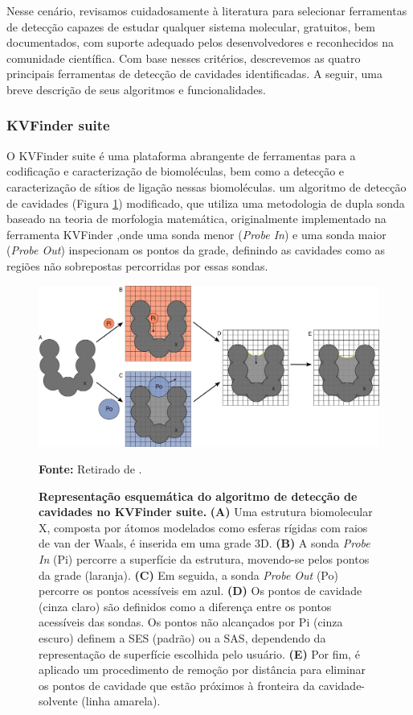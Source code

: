 \documentclass[Portugues]{phdquali}
\begin{document}
Nesse cenário, revisamos cuidadosamente à literatura para selecionar ferramentas de detecção capazes de estudar qualquer sistema molecular, gratuitos, bem documentados, com suporte adequado pelos desenvolvedores e reconhecidos na comunidade científica. Com base nesses critérios, descrevemos as quatro principais ferramentas de detecção de cavidades identificadas. A seguir, uma breve descrição de seus algoritmos e funcionalidades.

\subsubsection{KVFinder suite}

O KVFinder suite é uma plataforma abrangente de ferramentas para a codificação e caracterização de biomoléculas, bem como a detecção e caracterização de sítios de ligação nessas biomoléculas.  um algoritmo de detecção de cavidades (Figura \ref{fig:kvfinder-suite-schema}) modificado, que  utiliza uma metodologia de dupla sonda baseado na teoria de morfologia matemática, originalmente implementado na ferramenta KVFinder \cite{oliveira2014},onde uma sonda menor (\textit{Probe In}) e uma sonda maior (\textit{Probe Out}) inspecionam os pontos da grade, definindo as cavidades como as regiões não sobrepostas percorridas por essas sondas. 

\begin{figure}[ht]
  \centerline{\includegraphics[scale=0.65]{images/kvfinder-suite-schema.png}}
  \centerline{\scriptsize{\textbf{Fonte:} Retirado de \cite{guerra2023B}.}}
  \caption[Representação esquemática do algoritmo de detecção de cavidades no KVFinder suite]{\textbf{Representação esquemática do algoritmo de detecção de cavidades no KVFinder suite.} \textbf{(A)} Uma estrutura biomolecular X, composta por átomos modelados como esferas rígidas com raios de van der Waals, é inserida em uma grade 3D. \textbf{(B)} A sonda \textit{Probe In} (Pi) percorre a superfície da estrutura, movendo-se pelos pontos da grade (laranja). \textbf{(C)} Em seguida, a sonda \textit{Probe Out} (Po) percorre os pontos acessíveis em azul. \textbf{(D)} Os pontos de cavidade (cinza claro) são definidos como a diferença entre os pontos acessíveis das sondas. Os pontos não alcançados por Pi (cinza escuro) definem a SES (padrão) ou a SAS, dependendo da representação de superfície escolhida pelo usuário. \textbf{(E)} Por fim, é aplicado um procedimento de remoção por distância para eliminar os pontos de cavidade que estão próximos à fronteira da cavidade-solvente (linha amarela).}
  \label{fig:kvfinder-suite-schema}
\end{figure}
\end{document}
